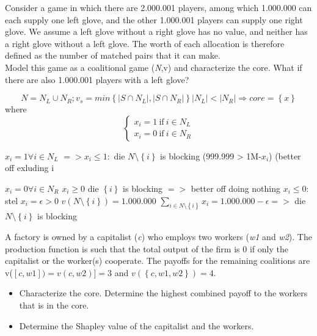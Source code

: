 \documentclass[../main.tex]{subfiles}
\begin{document}

\begin{question}

Consider a game in which there are 2.000.001 players, among which 1.000.000 can each supply one left glove, and the other 1.000.001 players can supply one right glove. We assume a left glove without a right glove has no value, and neither has a right glove without a left glove. The worth of each allocation is therefore defined as the number of matched pairs that it can make.\\

Model this game as a coalitional game (\textit{N},v) and characterize the core. What if there are also 1.000.001 players with a left glove?

\end{question}

\begin{solution} 
\[
N = N_L \cup N_R; v_s = min \left\{ |S \cap N_L|, |S \cap N_R| \right\}
|N_L| < |N_R| \Rightarrow core = \left\{x\right\} 
\]
where 
\[
\begin{cases}
 x_i = 1 ~ \text{if} ~ i \in N_L \\
 x_i = 0 ~ \text{if} ~ i \in N_R
\end{cases}
\]


$x_i = 1 \forall i \in N_L$
$=> x_i \leq 1:$ die $N \setminus \left\{i\right\}$ is blocking (999.999 > 1M-$x_i$) (better off exluding i

$x_i = 0 \forall i \in N_R$
	$x_i \geq 0$ die $\left\{i\right\}$ is blocking $=>$ better off doing nothing
	$x_i \leq 0$: 
		stel $x_i = \epsilon > 0$
			$v(N \setminus \left\{i\right\}) = 1.000.000$
			$\sum_{i \in N\setminus\left\{i\right\}} x_i = 1.000.000 - \epsilon =>$ die $N\setminus\left\{i\right\}$ is blocking
\end{solution}

\begin{question}[Capitalism]
A factory is owned by a capitalist (\textit{c}) who employs two workers (\textit{w1} and \textit{w2}). The production function is such that the total output of the firm is 0 if only the capitalist or the worker(s) cooperate. The payoffs for the remaining coalitions are v($[c,w1]) = v(c,w2)] = 3$ and $v(\left\{c,w1,w2\right\})=4$.

    \begin{itemize}
        \item Characterize the core. Determine the highest combined payoff to the workers that is in the core.
        \item Determine the Shapley value of the capitalist and the workers.
    \end{itemize}
\end{question}
\end{document}
